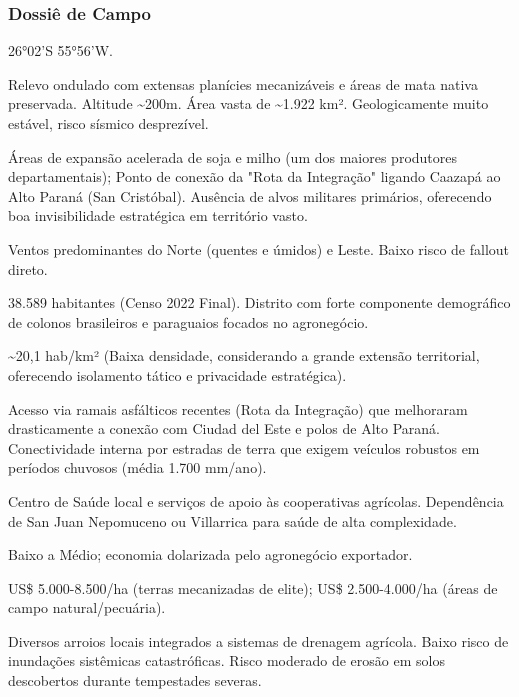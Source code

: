\subsubsection{Dossiê de Campo}
\begin{description}[style=nextline,leftmargin=0.5cm,font=\bfseries]
\item[Coordenadas]  26°02'S 55°56'W.
\item[Topografia]  Relevo ondulado com extensas planícies mecanizáveis e áreas de mata nativa preservada. Altitude \textasciitilde 200m. Área vasta de \textasciitilde 1.922 km². Geologicamente muito estável, risco sísmico desprezível.
\item[Alvos Estratégicos]  Áreas de expansão acelerada de soja e milho (um dos maiores produtores departamentais); Ponto de conexão da "Rota da Integração" ligando Caazapá ao Alto Paraná (San Cristóbal). Ausência de alvos militares primários, oferecendo boa invisibilidade estratégica em território vasto.
\item[Fallout]  Ventos predominantes do Norte (quentes e úmidos) e Leste. Baixo risco de fallout direto.
\item[População]  38.589 habitantes (Censo 2022 Final). Distrito com forte componente demográfico de colonos brasileiros e paraguaios focados no agronegócio.
\item[Densidade]  \textasciitilde 20,1 hab/\allowbreak km² (Baixa densidade, considerando a grande extensão territorial, oferecendo isolamento tático e privacidade estratégica).
\item[Vias de Acesso]  Acesso via ramais asfálticos recentes (Rota da Integração) que melhoraram drasticamente a conexão com Ciudad del Este e polos de Alto Paraná. Conectividade interna por estradas de terra que exigem veículos robustos em períodos chuvosos (média 1.700 mm/\allowbreak ano).
\item[Serviços]  Centro de Saúde local e serviços de apoio às cooperativas agrícolas. Dependência de San Juan Nepomuceno ou Villarrica para saúde de alta complexidade.
\item[Custo de Vida]  Baixo a Médio; economia dolarizada pelo agronegócio exportador.
\item[Preço da Terra]  US\$ 5.000-8.500/\allowbreak ha (terras mecanizadas de elite); US\$ 2.500-4.000/\allowbreak ha (áreas de campo natural/\allowbreak pecuária).
\item[Hidrologia]  Diversos arroios locais integrados a sistemas de drenagem agrícola. Baixo risco de inundações sistêmicas catastróficas. Risco moderado de erosão em solos descobertos durante tempestades severas.

\end{description}
